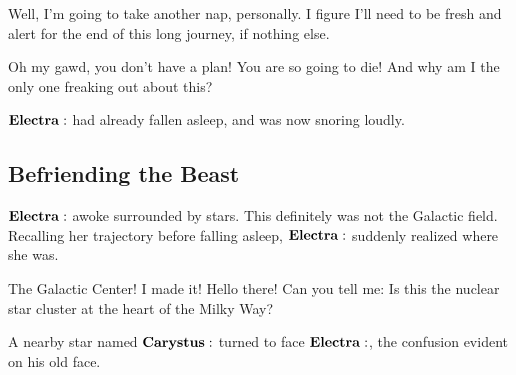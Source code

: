 \documentclass[main.tex]{subfiles}
\begin{document}
\Electra Well, I'm going to take another nap, personally.  I figure I'll need to be fresh and alert for the end of this long journey, if nothing else.

\Dardanus Oh my gawd, you don't have a plan!  You are so going to die!  And why am I the only one freaking out about this?

$\Electra$ had already fallen asleep, and was now snoring loudly.

\subsection{Befriending the Beast} \label{beast}

$\Electra$ awoke surrounded by stars.  This definitely was not the Galactic field.  Recalling her trajectory before falling asleep, $\Electra$ suddenly realized where she was.

\Electra The Galactic Center!  I made it!  Hello there!  Can you tell me:  Is this the nuclear star cluster at the heart of the Milky Way?

A nearby star named $\Carystus$ turned to face $\Electra$, the confusion evident on his old face.  
\end{document}
